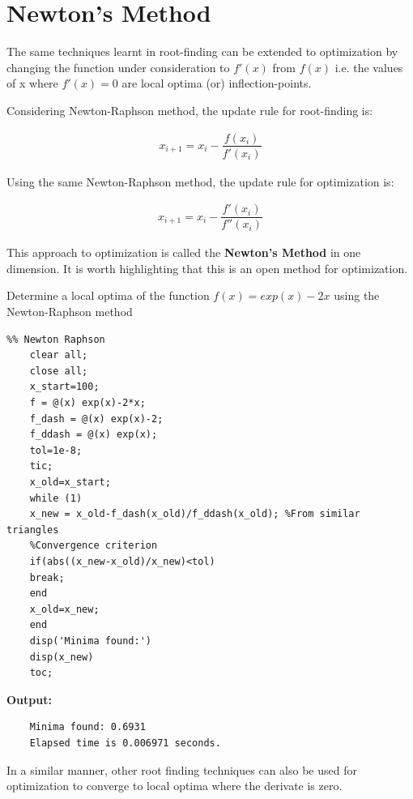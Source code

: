 \documentclass[book.tex]{subfiles}
\begin{document}
\section{Newton's Method}

The same techniques learnt in root-finding can be extended to optimization by changing the function under consideration to $f'(x)$ from $f(x)$ i.e. the values of x where $f'(x) = 0$ are local optima (or) inflection-points.

Considering Newton-Raphson method, the update rule for root-finding is:

\begin{align}
 x_{i+1} = x_i - \dfrac{f(x_i)}{f'(x_i)}
\end{align}
 
Using the same Newton-Raphson method, the update rule for optimization is:
 
\begin{align}
x_{i+1} = x_i - \dfrac{f'(x_i)}{f''(x_i)}
\end{align}
 
This approach to optimization is called the \textbf{Newton's Method} in one dimension. It is worth highlighting that this is an open method for optimization. 
  
\begin{example} Determine a local optima of the function $f(x) = exp(x)-2x$ using the Newton-Raphson method
\begin{fullwidth}
  	\begin{verbatim}
%% Newton Raphson
	clear all;
	close all;
	x_start=100;
	f = @(x) exp(x)-2*x;
	f_dash = @(x) exp(x)-2;
	f_ddash = @(x) exp(x);
	tol=1e-8;
	tic;
	x_old=x_start;
	while (1) 
	x_new = x_old-f_dash(x_old)/f_ddash(x_old); %From similar triangles 
	%Convergence criterion
	if(abs((x_new-x_old)/x_new)<tol)
	break;
	end
	x_old=x_new;
	end
	disp('Minima found:') 
	disp(x_new)
	toc;
  	\end{verbatim}
\end{fullwidth}

\begin{margintable}
	\textbf{Output:}
	\vspace{-8pt}
	\begin{verbatim}
	Minima found: 0.6931
	Elapsed time is 0.006971 seconds.
	\end{verbatim}
\end{margintable}
\end{example}
	
In a similar manner, other root finding techniques can also be used for optimization to converge to local optima where the derivate is zero.
  
\end{document}
